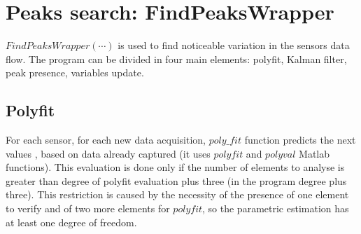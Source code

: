 \documentclass[journal]{IEEEtran}
\begin{document}
\section{Peaks search: FindPeaksWrapper}

\(FindPeaksWrapper(\cdots)\) is used to find noticeable variation in the sensors data flow.
The program can be divided in four main elements: polyfit, Kalman filter, peak presence, variables update.

\subsection{Polyfit}
For each sensor, for each new data acquisition, \(poly\_fit\) function predicts the next values , based on data already captured (it uses \(polyfit\) and \(polyval\) Matlab functions).
This evaluation is done only if the number of elements to analyse is greater than degree of polyfit
evaluation plus three (in the program degree plus three). This restriction is caused by the necessity
of the presence of one element to verify and of two more elements for \(polyfit\), so the parametric estimation has at least one degree of freedom.
\end{document}
